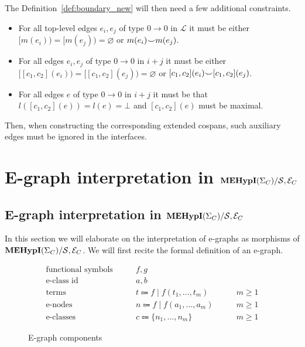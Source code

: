 The Definition~\ref{def:boundary_new} will then need a few additional constraints.
\begin{itemize}
\item For all top-level edges $e_{i}, e_{j}$ of type $0 \to 0$ in $\mathcal{L}$ it must be either $[m(e_{i})) = [m(e_{j})) = \varnothing$ or $m(e_{i}) {\smile} m(e_{j})$.
\item For all edges $e_{i}, e_{j}$ of type $0 \to 0$ in $i + j$ it must be either $[[c_1,c_2](e_{i})) = [[c_1,c_2](e_{j})) = \varnothing$ or $[c_1,c_2](e_{i}) {\smile} [c_1,c_2](e_{j})$.
\item For all edges $e$ of type $0 \to 0$ in $i + j$ it must be that $l([c_1,c_2](e)) = l(e) = \bot$ and $[c_1,c_2](e)$ must be maximal.
\end{itemize}
Then, when constructing the corresponding extended cospans, such auxiliary edges must be ignored in the interfaces.

\ifdefined\ONECOLUMN
\section{E-graph interpretation in $\mathbf{MEHypI}(\Sigma_{C}) / \mathcal{S}, \mathcal{E}_{C}$}
\else
\subsection{E-graph interpretation in $\mathbf{MEHypI}(\Sigma_{C}) / \mathcal{S}, \mathcal{E}_{C}$}
\fi
\label{sec:appendix:e-graph-translation}

In this section we will elaborate on the interpretation of e-graphs as morphisms of $\mathbf{MEHypI}(\Sigma_{C}) / \mathcal{S}, \mathcal{E}_{C}$.
We will first recite the formal definition of an e-graph.

\begin{figure}

\begin{align*}
    \text{functional symbols}& \hspace{2em} f,g\\
    \text{e-class id}& \hspace{2em} a,b\\
    \text{terms}& \hspace{2em} t \Coloneqq f \;|\; f (t_1, \ldots, t_m) \hspace{2em} &m \geq 1\\
    \text{e-nodes}& \hspace{2em} n \Coloneqq f \;|\; f (a_1, \ldots, a_m) \hspace{2em} &m \geq 1\\
    \text{e-classes}& \hspace{2em} c \Coloneqq \{n_1, \ldots, n_m\}   \hspace{2em} &m \geq 1
\end{align*}
\caption{E-graph components}
\label{fig:e-graph-components}
\end{figure}

